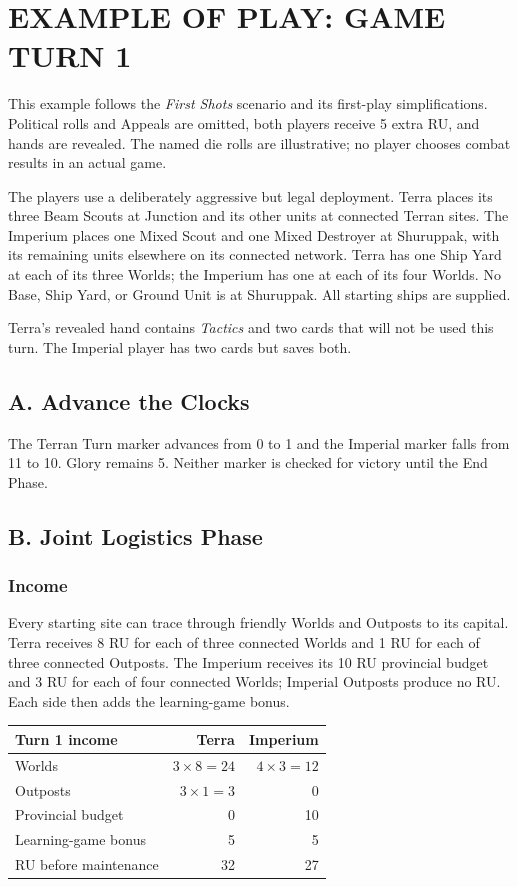 \clearpage
\section{EXAMPLE OF PLAY: GAME TURN 1}

This example follows the \textit{First Shots} scenario and its first-play
simplifications. Political rolls and Appeals are omitted, both players receive
5 extra RU, and hands are revealed. The named die rolls are illustrative; no
player chooses combat results in an actual game.

The players use a deliberately aggressive but legal deployment. Terra places
its three Beam Scouts at Junction and its other units at connected Terran
sites. The Imperium places one Mixed Scout and one Mixed Destroyer at
Shuruppak, with its remaining units elsewhere on its connected network. Terra
has one Ship Yard at each of its three Worlds; the Imperium has one at each of
its four Worlds. No Base, Ship Yard, or Ground Unit is at Shuruppak. All
starting ships are supplied.

Terra's revealed hand contains \textit{Tactics} and two cards that will not be
used this turn. The Imperial player has two cards but saves both.

\subsection{A. Advance the Clocks}

The Terran Turn marker advances from 0 to 1 and the Imperial marker falls from
11 to 10. Glory remains 5. Neither marker is checked for victory until the End
Phase.

\subsection{B. Joint Logistics Phase}

\subsubsection{Income}

Every starting site can trace through friendly Worlds and Outposts to its
capital. Terra receives 8 RU for each of three connected Worlds and 1 RU for
each of three connected Outposts. The Imperium receives its 10 RU provincial
budget and 3 RU for each of four connected Worlds; Imperial Outposts produce
no RU. Each side then adds the learning-game bonus.

\begin{tabularx}{\columnwidth}{@{}Xrr@{}}
\toprule
Turn 1 income & Terra & Imperium \\
\midrule
Worlds & $3\times8=24$ & $4\times3=12$ \\
Outposts & $3\times1=3$ & 0 \\
Provincial budget & 0 & 10 \\
Learning-game bonus & 5 & 5 \\
\midrule
RU before maintenance & 32 & 27 \\
\bottomrule
\end{tabularx}

